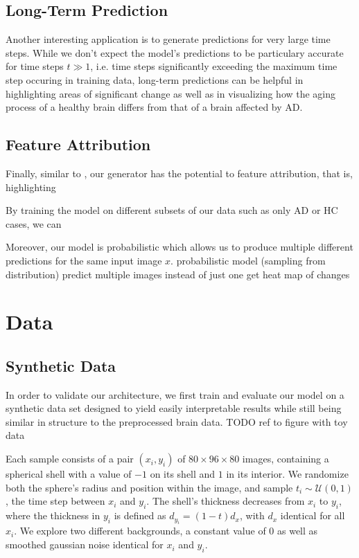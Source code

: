 \section{Long-Term Prediction}
Another interesting application is to generate predictions for very large time steps. While we don't expect the model's predictions to be particulary accurate for time steps $t \gg 1$, i.e. time steps significantly exceeding the maximum time step occuring in training data, long-term predictions can be helpful in highlighting areas of significant change as well as in visualizing how the aging process of a healthy brain differs from that of a brain affected by AD.

\section{Feature Attribution}
Finally, similar to \cite{baumgartner2018visual}, our generator has the potential to feature attribution, that is, highlighting 

By training the model on different subsets of our data such as only AD or HC cases, we can 

Moreover, our model is probabilistic which allows us to produce multiple different predictions for the same input image $x$.
probabilistic model (sampling from distribution)
predict multiple images instead of just one
get heat map of changes

\chapter{Data}

\section{Synthetic Data} \label{sec:synth}
In order to validate our architecture, we first train and evaluate our model on a synthetic data set designed to yield easily interpretable results while still being similar in structure to the preprocessed brain data. TODO ref to figure with toy data

Each sample consists of a pair $(x_i, y_i)$ of $ 80 \times 96 \times 80 $ images, containing a spherical shell with a value of $-1$ on its shell and $1$ in its interior. We randomize both the sphere's radius and position within the image, and sample $t_i \sim \mathcal{U}(0, 1)$, the time step between $x_i$ and $y_i$. The shell's thickness decreases from $x_i$ to $y_i$, where the thickness in $y_i$ is defined as $d_{y_i} = (1-t) d_x$, with $d_x$ identical for all $x_i$. We explore two different backgrounds, a constant value of 0 as well as smoothed gaussian noise identical for $x_i$ and $y_i$.

